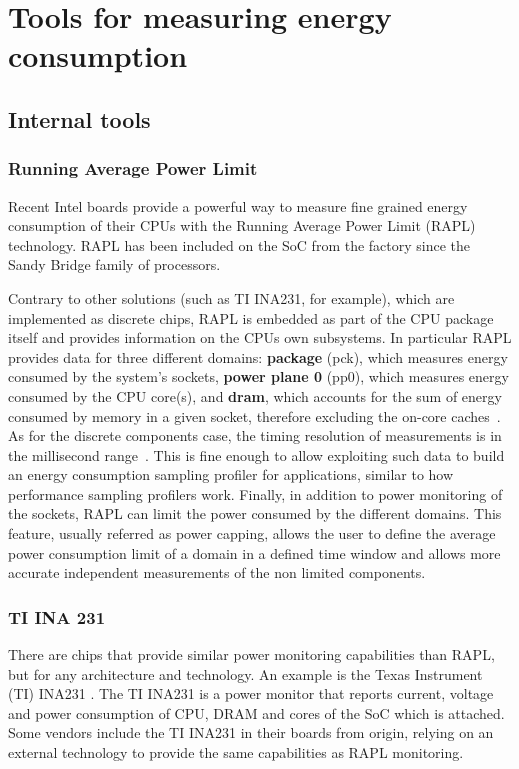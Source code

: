 \section{Tools for measuring energy consumption}

\subsection*{Internal tools}

\subsubsection*{Running Average Power Limit}
Recent Intel boards provide a powerful way to measure fine grained energy consumption of their CPUs with the Running Average Power Limit (RAPL) technology. RAPL has been included on the SoC from the factory since the Sandy Bridge family of processors.

Contrary to other solutions (such as TI INA231, for example), which are implemented as discrete
chips, RAPL is embedded as part of the CPU package itself and
provides information on the CPUs own subsystems. In particular RAPL
provides data for three different domains: \textbf{package} (pck),
which measures energy consumed by the system's sockets, \textbf{power
plane 0} (pp0), which measures energy consumed by the CPU core(s),
and \textbf{dram}, which accounts for the sum of energy consumed
by memory in a given socket, therefore excluding the on-core
caches~\cite{INTELMAN}. As for the discrete components case, the
timing resolution of measurements is in the millisecond range~\cite{RAPL1}.
This is fine enough to allow exploiting such data to build an energy
consumption sampling profiler for applications, similar to how performance
sampling profilers work.
Finally, in addition to power
monitoring of the sockets, RAPL can limit the power consumed by the
different domains. This feature, usually referred as power capping,
allows the user to define the average power consumption limit of a
domain in a defined time window and allows more accurate independent
measurements of the non limited components.

\subsubsection*{TI INA 231}
There are chips that provide similar power monitoring capabilities than RAPL, but for any architecture and technology. An example is the Texas Instrument (TI) INA231 \cite{TIINA231}. The TI INA231 is a power monitor that reports current, voltage and power consumption of CPU, DRAM and cores of the SoC which is attached. Some vendors include the TI INA231 in their boards from origin, relying on an external technology to provide the same capabilities as RAPL monitoring.

